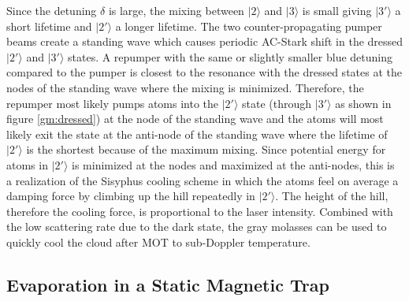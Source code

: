 Since the detuning $\delta$ is large, the mixing between $|2\rangle$ and $|3\rangle$ is small giving $|3'\rangle$ a short lifetime and $|2'\rangle$ a longer lifetime. The two counter-propagating pumper beams create a standing wave which causes periodic AC-Stark shift in the dressed $|2'\rangle$ and $|3'\rangle$ states. A repumper with the same or slightly smaller blue detuning compared to the pumper is closest to the resonance with the dressed states at the nodes of the standing wave where the mixing is minimized. Therefore, the repumper most likely pumps atoms into the $|2'\rangle$ state (through $|3'\rangle$ as shown in figure \ref{gm:dressed}) at the node of the standing wave and the atoms will most likely exit the state at the anti-node of the standing wave where the lifetime of $|2'\rangle$ is the shortest because of the maximum mixing. Since potential energy for atoms in $|2'\rangle$ is minimized at the nodes and maximized at the anti-nodes, this is a realization of the Sisyphus cooling scheme in which the atoms feel on average a damping force by climbing up the hill repeatedly in $|2'\rangle$. The height of the hill, therefore the cooling force, is proportional to the laser intensity. Combined with the low scattering rate due to the dark state, the gray molasses can be used to quickly cool the cloud after MOT to sub-Doppler temperature.

\subsection{Evaporation in a Static Magnetic Trap}\label{theory:mt}

